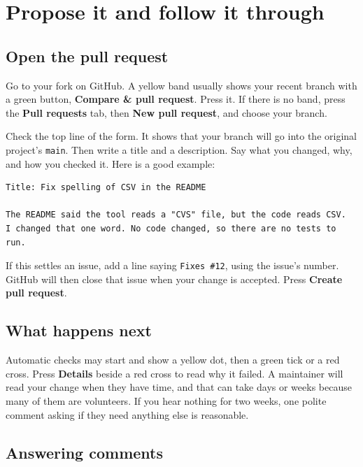\chapter{Propose it and follow it through}
\label{ch:propose}

\section{Open the pull request}

Go to your fork on GitHub. A yellow band usually shows your recent branch with a green button, \textbf{Compare \& pull request}. Press it. If there is no band, press the \textbf{Pull requests} tab, then \textbf{New pull request}, and choose your branch.


Check the top line of the form. It shows that your branch will go into the original project's \texttt{main}. Then write a title and a description. Say what you changed, why, and how you checked it. Here is a good example:

\begin{lstlisting}[language=text]
Title: Fix spelling of CSV in the README

The README said the tool reads a "CVS" file, but the code reads CSV.
I changed that one word. No code changed, so there are no tests to run.
\end{lstlisting}

If this settles an issue, add a line saying \texttt{Fixes \#12}, using the issue's number. GitHub will then close that issue when your change is accepted. Press \textbf{Create pull request}.

\section{What happens next}

Automatic checks may start and show a yellow dot, then a green tick or a red cross. Press \textbf{Details} beside a red cross to read why it failed. A maintainer will read your change when they have time, and that can take days or weeks because many of them are volunteers. If you hear nothing for two weeks, one polite comment asking if they need anything else is reasonable.

\section{Answering comments}

